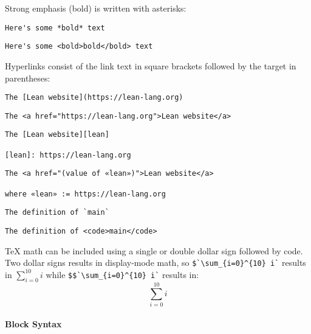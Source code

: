 \documentclass{memoir}
\begin{document}
Strong emphasis (bold) is written with asterisks:

\begin{verbatim}
Here's some *bold* text

\end{verbatim}
\begin{verbatim}
Here's some <bold>bold</bold> text

\end{verbatim}


Hyperlinks consist of the link text in square brackets followed by the target in parentheses:

\begin{verbatim}
The [Lean website](https://lean-lang.org)

\end{verbatim}
\begin{verbatim}
The <a href="https://lean-lang.org">Lean website</a>

\end{verbatim}


\begin{verbatim}
The [Lean website][lean]

[lean]: https://lean-lang.org

\end{verbatim}
\begin{verbatim}
The <a href="(value of «lean»)">Lean website</a>

where «lean» := https://lean-lang.org
\end{verbatim}


\begin{verbatim}
The definition of `main`

\end{verbatim}
\begin{verbatim}
The definition of <code>main</code>

\end{verbatim}


TeX math can be included using a single or double dollar sign followed by code. Two dollar signs results in display-mode math, so \Verb|$`\sum_{i=0}^{10} i`| results in $\sum_{i=0}^{10} i$ while \Verb|$$`\sum_{i=0}^{10} i`| results in: \[\sum_{i=0}^{10} i\]



\paragraph{Block Syntax}
\end{document}
